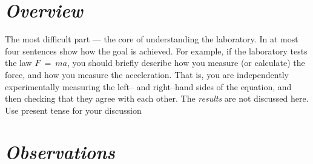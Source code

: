 \documentclass[epsfig,12pt]{article}
\begin{document}
\section*{\textit{Overview}}

	The most difficult part --- the core of understanding the laboratory.
	In at most four sentences show how the goal is achieved.
	For example, if the laboratory tests the law $ F ~=~ m a $,
	you should briefly describe how you measure (or calculate) the force,
	and how you measure the acceleration.
	That is, you are independently experimentally measuring the left-- and right--hand sides 
	of the equation, and then checking that they agree with each other.
	The \emph{results} are not discussed here.
	Use present tense for your discussion
	

\section*{\textit{Observations}}
\end{document}
